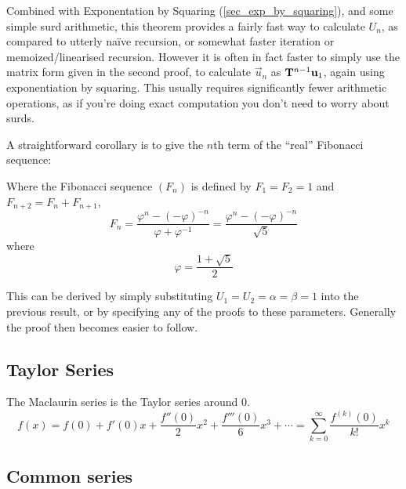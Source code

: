 Combined with Exponentation by Squaring (\ref{sec_exp_by_squaring}), and some
simple surd arithmetic, this theorem provides a fairly fast way to calculate
\(U_n\), as compared to utterly na\"ive recursion, or somewhat faster iteration
or memoized/linearised recursion. However it is often in fact faster to
simply use the matrix form given in the second proof, to calculate
\(\vec u_n\) as \(\mathbf{T}^{n - 1}\mathrm{\mathbf{u}}_1\), again using exponentiation by
squaring. This usually requires significantly fewer arithmetic operations, as if
you're doing exact computation you don't need to worry about surds.

A straightforward corollary is to give the \(n\)th term of the ``real''
Fibonacci sequence:
\begin{corollary}
 Where the Fibonacci sequence \((F_n)\) is defined by \(F_1 = F_2 = 1\) and
 \(F_{n + 2} = F_n + F_{n + 1}\),
 \begin{equation*}
  F_n = \frac{\varphi^n - (-\varphi)^{-n}}{\varphi + \varphi^{-1}}
      = \frac{\varphi^n - (-\varphi)^{-n}}{\sqrt 5}
 \end{equation*}
 where
 \begin{equation*}
  \varphi = \frac{1 + \sqrt 5}2
 \end{equation*}
\end{corollary}
This can be derived by simply substituting \(U_1 = U_2 = \alpha = \beta = 1\)
into the previous result, or by specifying any of the proofs to these
parameters. Generally the proof then becomes easier to follow.

\subsection{Taylor Series}

The Maclaurin series is the Taylor series around \(0\).
\begin{equation*}
f(x) = f(0) + f'(0) x + \frac{f''(0)} 2 x^2 + \frac{f'''(0)}6 x^3 +\dotsb
  = \sum_{k=0}^\infty \frac{f^{(k)}(0)}{k!}x^k
\end{equation*}

\subsection{Common series}
